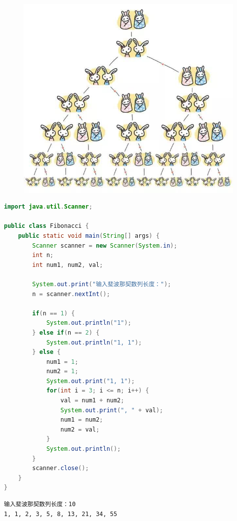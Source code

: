 \begin{figure}[H]
	\centering
	\includegraphics[scale=0.45]{img/C4/4-4/1.png}
\end{figure}

\begin{lstlisting}[language=Java]
import java.util.Scanner;

public class Fibonacci {
    public static void main(String[] args) {
        Scanner scanner = new Scanner(System.in);
        int n;
        int num1, num2, val;
        
        System.out.print("输入斐波那契数列长度：");
        n = scanner.nextInt();
        
        if(n == 1) {
            System.out.println("1");
        } else if(n == 2) {
            System.out.println("1, 1");
        } else {
            num1 = 1;
            num2 = 1;
            System.out.print("1, 1");
            for(int i = 3; i <= n; i++) {
                val = num1 + num2;
                System.out.print(", " + val);
                num1 = num2;
                num2 = val;
            }
            System.out.println();
        }
        scanner.close();
    }
}
\end{lstlisting}

\begin{tcolorbox}
	\begin{verbatim}
输入斐波那契数列长度：10
1, 1, 2, 3, 5, 8, 13, 21, 34, 55
    \end{verbatim}
\end{tcolorbox}

